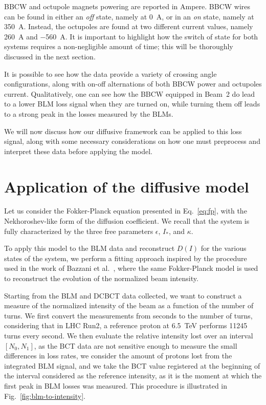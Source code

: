 BBCW and octupole magnets powering are reported in Ampere. BBCW wires can be found in either an \textit{off} state, namely at \SI{0}{\ampere}, or in an \textit{on} state, namely at \SI{350}{\ampere}. Instead, the octupoles are found at two different current values, namely \SI{260}{\ampere} and \SI{-560}{\ampere}. It is important to highlight how the switch of state for both systems requires a non-negligible amount of time; this will be thoroughly discussed in the next section.

It is possible to see how the data provide a variety of crossing angle configurations, along with on-off alternations of both BBCW power and octupoles current. Qualitatively, one can see how the BBCW equipped in Beam~2 do lead to a lower BLM loss signal when they are turned on, while turning them off leads to a strong peak in the losses measured by the BLMs.

We will now discuss how our diffusive framework can be applied to this loss signal, along with some necessary considerations on how one must preprocess and interpret these data before applying the model. 

\section{Application of the diffusive model}\label{sec:5:wire-model}

Let us consider the Fokker-Planck equation presented in Eq.~\eqref{eq:fp}, with the Nekhoroshev-like form of the diffusion coefficient. We recall that the system is fully characterized by the three free parameters $\epsilon$, $I_\ast$, and $\kappa$.

To apply this model to the BLM data and reconstruct $D(I)$ for the various states of the system, we perform a fitting approach inspired by the procedure used in the work of Bazzani et al.~\cite{bazzani2020diffusion}, where the same Fokker-Planck model is used to reconstruct the evolution of the normalized beam intensity.

Starting from the BLM and DCBCT data collected, we want to construct a measure of the normalized intensity of the beam as a function of the number of turns. We first convert the measurements from seconds to the number of turns, considering that in LHC Run2, a reference proton at \SI{6.5}{TeV} performs 11245 turns every second. We then evaluate the relative intensity lost over an interval $[N_0, N_1]$, as the BCT data are not sensitive enough to measure the small differences in loss rates, we consider the amount of protons lost from the integrated BLM signal, and we take the BCT value registered at the beginning of the interval considered as the reference intensity, as it is the moment at which the first peak in BLM losses was measured. This procedure is illustrated in Fig.~\ref{fig:blm-to-intensity}.

